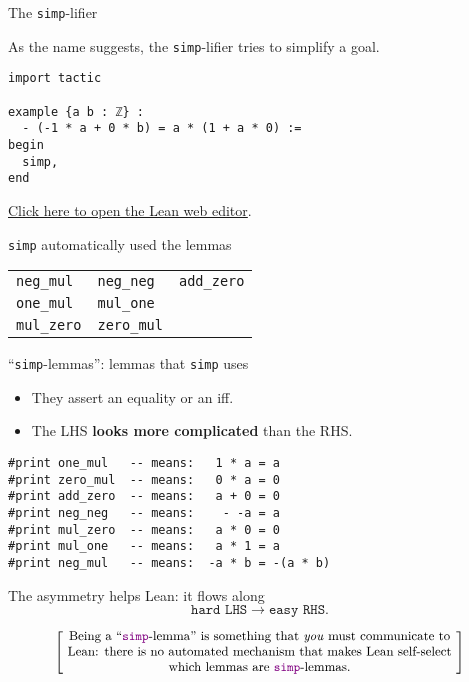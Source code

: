 \documentclass{beamer}
\begin{document}
\begin{frame}[fragile]{The {\color{violet}\texttt{simp}}-lifier}

As the name suggests, the {\color{violet}\verb`simp`}-lifier tries to simplify a goal.

\begin{verbatim}
import tactic

example {a b : ℤ} :
  - (-1 * a + 0 * b) = a * (1 + a * 0) :=
begin
  simp,
end
\end{verbatim}

{\small{\href{https://leanprover-community.github.io/lean-web-editor/#code=import%20tactic%0A%0Aexample%20%7Ba%20b%20%3A%20%E2%84%A4%7D%20%3A%0A%20%20-%20%28-1%20*%20a%20%2B%200%20*%20b%29%20%3D%20a%20*%20%281%20%2B%20a%20*%200%29%20%3A%3D%0Abegin%0A%20%20simp%2C%0Aend}{Click here to open the Lean web editor}.}}
\bigskip

{\color{violet}\verb`simp`} automatically used the lemmas
\bigskip

\begin{tabular}{|l|l|l|}
\hline
{\color{violet}\verb`neg_mul`} & {\color{violet}\verb`neg_neg`} & {\color{violet}\verb`add_zero`} \\
{\color{violet}\verb`one_mul`} & {\color{violet}\verb`mul_one`} &\\
{\color{violet}\verb`mul_zero`} & {\color{violet}\verb`zero_mul`} &\\
\hline
\end{tabular}

\end{frame}

\begin{frame}[fragile]{``{\color{violet}\texttt{simp}}-lemmas'': lemmas that {\color{violet}\texttt{simp}} uses}

\begin{itemize}
\item
  They assert an equality or an iff.
\item
  The LHS {\textbf{looks more complicated}} than the RHS.
\end{itemize}

\begin{verbatim}
#print one_mul   -- means:   1 * a = a
#print zero_mul  -- means:   0 * a = 0
#print add_zero  -- means:   a + 0 = 0
#print neg_neg   -- means:    - -a = a
#print mul_zero  -- means:   a * 0 = 0
#print mul_one   -- means:   a * 1 = a
#print neg_mul   -- means:  -a * b = -(a * b)
\end{verbatim}

The asymmetry helps Lean: it flows along
$${\texttt{hard LHS}} \longrightarrow {\texttt{easy RHS}}.$$

\smallskip
\[
  \left[ \;
  \parbox{0.8\textwidth}{\centering\small
  Being a ``{\color{violet}\texttt{simp}}-lemma'' is something that {\emph{you}} must communicate to Lean: there is no automated mechanism that makes Lean self-select which lemmas are {\color{violet}\texttt{simp}}-lemmas.
  }
  \; \right]
\]
\bigskip
\end{frame}
\end{document}
